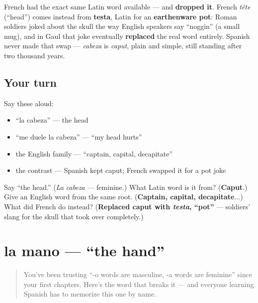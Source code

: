 \begin{culture}
French had the exact same Latin word available — and \textbf{dropped it}. French \emph{tête} (\textquotedblleft{}head\textquotedblright{}) comes instead from \textbf{testa}, Latin for an \textbf{earthenware pot}: Roman soldiers joked about the skull the way English speakers say \textquotedblleft{}noggin\textquotedblright{} (a small mug), and in Gaul that joke eventually \textbf{replaced} the real word entirely. Spanish never made that swap — \emph{cabeza} is \emph{caput}, plain and simple, still standing after two thousand years.
\end{culture}

\subsection*{Your turn}
Say these aloud:

\begin{itemize}
\raggedright
  \item \textquotedblleft{}la cabeza\textquotedblright{} — the head
  \item \textquotedblleft{}me duele la cabeza\textquotedblright{} — \textquotedblleft{}my head hurts\textquotedblright{}
  \item the English family — \textquotedblleft{}captain, capital, decapitate\textquotedblright{}
  \item the contrast — Spanish kept caput; French swapped it for a pot joke
\end{itemize}

\begin{tcolorbox}[breakable,colback=teal!4,colframe=teal!35!black,title={Before you move on}]
Say \textquotedblleft{}the head.\textquotedblright{} (\emph{La cabeza} — feminine.) What Latin word is it from? (\textbf{Caput}.) Give an English word from the same root. (\textbf{Captain, capital, decapitate}...) What did French do instead? (\textbf{Replaced caput with \emph{testa}, \textquotedblleft{}pot\textquotedblright{}} — soldiers' slang for the skull that took over completely.)
\end{tcolorbox}
\section[la mano]{la mano — \textquotedblleft{}the hand\textquotedblright{}}

\label{lesson:ES-C24-mano}



\begin{quote}
You've been trusting \textquotedblleft{}-o words are masculine, -a words are feminine\textquotedblright{} since your first chapters. Here's the word that breaks it — and everyone learning Spanish has to memorize this one by name.
\end{quote}

